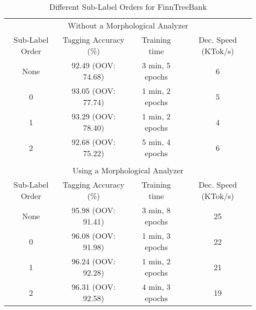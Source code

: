 \begin{table}[htb!]
\begin{center}
\begin{tabular}{cccc}
\multicolumn{4}{c}{Without a Morphological Analyzer}\\
Sub-Label Order & Tagging Accuracy (\%) & Training time    & Dec. Speed (KTok/s)\\
\hline
None            & 92.49 (OOV: 74.68)    & 3 min, 5 epochs  & 6                       \\
0               & 93.05 (OOV: 77.74)    & 1 min, 2 epochs  & 5                       \\
1               & 93.29 (OOV: 78.40)    & 1 min, 2 epochs  & 4                       \\
2               & 92.68 (OOV: 75.22)    & 5 min, 4 epochs  & 6                       \\
                &                       &                  &                          \\
\multicolumn{4}{c}{Using a Morphological Analyzer}\\
Sub-Label Order & Tagging Accuracy (\%) & Training time    & Dec. Speed (KTok/s)\\
\hline
None     & 95.98 (OOV: 91.41)           & 3 min, 8 epochs  & 25                       \\
0        & 96.08 (OOV: 91.98)           & 1 min, 3 epochs  & 22                       \\
1        & 96.24 (OOV: 92.28)           & 1 min, 2 epochs  & 21                       \\
2        & 96.31 (OOV: 92.58)           & 4 min, 3 epochs  & 19                       \\
\end{tabular}
\caption{Different Sub-Label Orders for FinnTreeBank}
\end{center}
\end{table}



